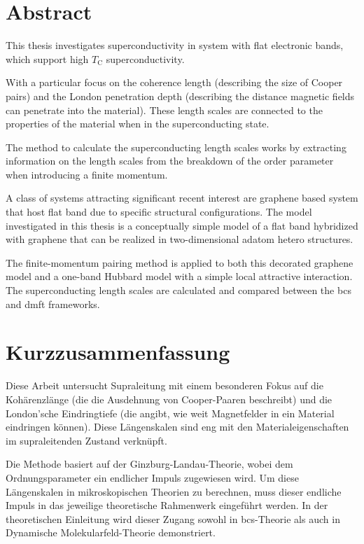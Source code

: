 \documentclass[../main.tex]{subfiles}
\begin{document}
\chapter*{Abstract}

This thesis investigates superconductivity in system with flat electronic bands, which support high \(T_{\mathrm{C}}\) superconductivity.


With a particular focus on the coherence length (describing the size of Cooper pairs) and the London penetration depth (describing the distance magnetic fields can penetrate into the material).
These length scales are connected to the properties of the material when in the superconducting state.



The method to calculate the superconducting length scales works by extracting information on the length scales from the breakdown of the order parameter when introducing a finite momentum.

A class of systems attracting significant recent interest are graphene based system that host flat band due to specific structural configurations.
The model investigated in this thesis is a conceptually simple model of a flat band hybridized with graphene that can be realized in two-dimensional adatom hetero structures.

The finite-momentum pairing method is applied to both this decorated graphene model and a one-band Hubbard model with a simple local attractive interaction.
The superconducting length scales are calculated and compared between the \gls{bcs} and \gls{dmft} frameworks.

\glsresetall
\chapter*{Kurzzusammenfassung}


Diese Arbeit untersucht Supraleitung mit einem besonderen Fokus auf die Kohärenzlänge (die die Ausdehnung von Cooper-Paaren beschreibt) und die London’sche Eindringtiefe (die angibt, wie weit Magnetfelder in ein Material eindringen können). Diese Längenskalen sind eng mit den Materialeigenschaften im supraleitenden Zustand verknüpft.

Die Methode basiert auf der Ginzburg-Landau-Theorie, wobei dem Ordnungsparameter ein endlicher Impuls zugewiesen wird. Um diese Längenskalen in mikroskopischen Theorien zu berechnen, muss dieser endliche Impuls in das jeweilige theoretische Rahmenwerk eingeführt werden. In der theoretischen Einleitung wird dieser Zugang sowohl in \gls{bcs}-Theorie als auch in 
Dynamische Molekularfeld-Theorie demonstriert.
\end{document}
